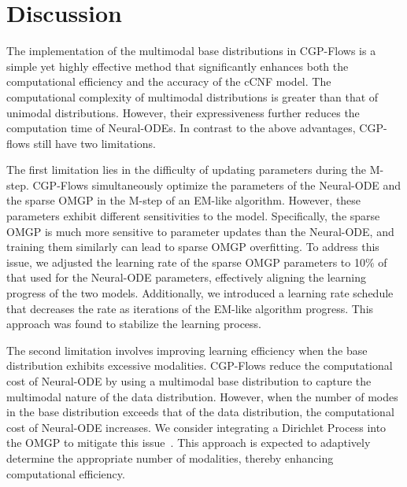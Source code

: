 \documentclass[sn-mathphys-num]{sn-jnl}
\begin{document}
\section{Discussion}
The implementation of the multimodal base distributions in CGP-Flows is a simple yet highly effective method that significantly enhances both the computational efficiency and the accuracy of the cCNF model.
The computational complexity of multimodal distributions is greater than that of unimodal distributions. However, their expressiveness further reduces the computation time of Neural-ODEs.
In contrast to the above advantages, CGP-flows still have two limitations.


The first limitation lies in the difficulty of updating parameters during the M-step.
CGP-Flows simultaneously optimize the parameters of the Neural-ODE and the sparse OMGP in the M-step of an EM-like algorithm.
However, these parameters exhibit different sensitivities to the model.
Specifically, the sparse OMGP is much more sensitive to parameter updates than the Neural-ODE, and training them similarly can lead to sparse OMGP overfitting.
To address this issue, we adjusted the learning rate of the sparse OMGP parameters to 10$\%$ of that used for the Neural-ODE parameters, effectively aligning the learning progress of the two models.
Additionally, we introduced a learning rate schedule that decreases the rate as iterations of the EM-like algorithm progress.
This approach was found to stabilize the learning process.


The second limitation involves improving learning efficiency when the base distribution exhibits excessive modalities.
CGP-Flows reduce the computational cost of Neural-ODE by using a multimodal base distribution to capture the multimodal nature of the data distribution.
However, when the number of modes in the base distribution exceeds that of the data distribution, the computational cost of Neural-ODE increases.
We consider integrating a Dirichlet Process into the OMGP to mitigate this issue~\cite{ross13a, OH202342}.
This approach is expected to adaptively determine the appropriate number of modalities, thereby enhancing computational efficiency.
\end{document}

